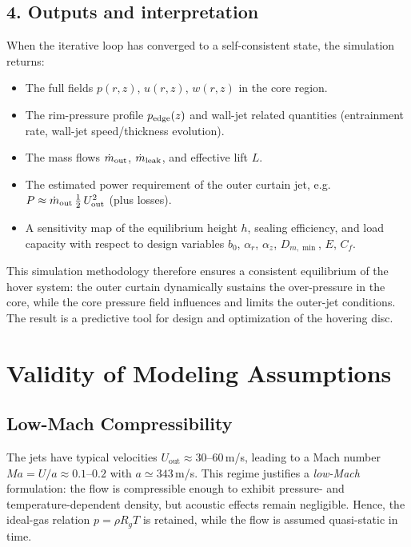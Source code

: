 \documentclass[11pt,a4paper]{article}
\begin{document}
\subsection*{4. Outputs and interpretation}
When the iterative loop has converged to a self-consistent state, the simulation returns:
\begin{itemize}
  \item The full fields \(p(r,z)\), \(u(r,z)\), \(w(r,z)\) in the core region.
  \item The rim-pressure profile \(p_{\rm edge}(z)\) and wall-jet related quantities (entrainment rate, wall-jet speed/thickness evolution).
  \item The mass flows \(\dot m_{\rm out}\), \(\dot m_{\rm leak}\), and effective lift \(L\).
  \item The estimated power requirement of the outer curtain jet, e.g.\ \(P \approx \dot m_{\rm out}\,\tfrac12\,U_{\rm out}^2\) (plus losses).
  \item A sensitivity map of the equilibrium height \(h\), sealing efficiency, and load capacity with respect to design variables \(b_0\), \(\alpha_r\), \(\alpha_z\), \(D_{m,\min}\), \(E\), \(C_f\).
\end{itemize}
This simulation methodology therefore ensures a consistent equilibrium of the hover system: the outer curtain dynamically sustains the over-pressure in the core, while the core pressure field influences and limits the outer-jet conditions. The result is a predictive tool for design and optimization of the hovering disc.




\section{Validity of Modeling Assumptions}
\label{sec:validity-of-modeling-assumptions}

\subsection{Low-Mach Compressibility}
The jets have typical velocities $U_{\mathrm{out}}\approx30$--$60\,$m/s, leading to a Mach number $Ma=U/a\approx0.1$--$0.2$ with $a\simeq343\,$m/s.
This regime justifies a \emph{low-Mach} formulation: the flow is compressible enough to exhibit pressure- and temperature-dependent density, but acoustic effects remain negligible.
Hence, the ideal-gas relation $p=\rho R_g T$ is retained, while the flow is assumed quasi-static in time.
\end{document}
